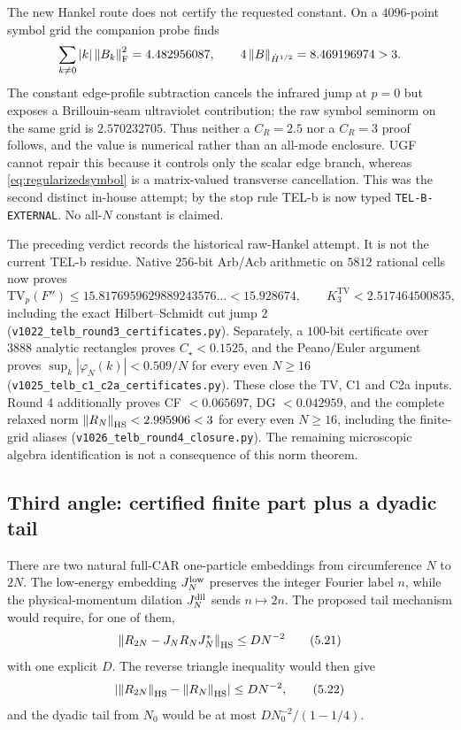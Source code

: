 \begin{remark}
The new Hankel route does not certify the requested constant.  On a
$4096$-point symbol grid the companion probe finds
\[
 \sum_{k\ne0}|k|\left\lVert B_k\right\rVert_{\mathrm F}^2
 =4.482956087,\qquad
 4\left\lVert B\right\rVert_{\dot H^{1/2}}=8.469196974>3.
\]
The constant edge-profile subtraction cancels the infrared jump at
$p=0$ but exposes a Brillouin-seam ultraviolet contribution; the raw
symbol seminorm on the same grid is $2.570232705$.  Thus neither a
$C_R=2.5$ nor a $C_R=3$ proof follows, and the value is numerical rather
than an all-mode enclosure.  UGF cannot repair this because it controls
only the scalar edge branch, whereas \eqref{eq:regularizedsymbol} is a
matrix-valued transverse cancellation.  This was the second distinct
in-house attempt; by the stop rule TEL-b is now typed
\texttt{TEL-B-EXTERNAL}.  No all-$N$ constant is claimed.
\end{remark}

\begin{remark}
The preceding verdict records the historical raw-Hankel attempt.  It is not the
current TEL-b residue.  Native $256$-bit Arb/Acb arithmetic on $5812$ rational
cells now proves
\[
 \mathrm{TV}_p(F'')\le15.8176959629889243576\ldots<15.928674,
 \qquad K_3^{\mathrm{TV}}<2.517464500835,
\]
including the exact Hilbert--Schmidt cut jump $2$
(\texttt{v1022\_telb\_round3\_certificates.py}).  Separately, a $100$-bit
certificate over $3888$ analytic rectangles proves
$C_\star<0.1525$, and the Peano/Euler argument proves
$\sup_k|\varphi_N(k)|<0.509/N$ for every even $N\ge16$
(\texttt{v1025\_telb\_c1\_c2a\_certificates.py}).  These close the TV, C1 and
C2a inputs. Round 4 additionally proves CF $<0.065697$, DG $<0.042959$,
and the complete relaxed norm $\left\lVert R_N\right\rVert_{\mathrm{HS}}<2.995906<3$ for every even
$N\ge16$, including the finite-grid aliases
(\texttt{v1026\_telb\_round4\_closure.py}). The remaining microscopic
algebra identification is not a consequence of this norm theorem.
\end{remark}

\subsection{Third angle: certified finite part plus a dyadic tail}

There are two natural full-CAR one-particle embeddings from circumference
$N$ to $2N$.  The low-energy embedding $J_N^{\rm low}$ preserves the
integer Fourier label $n$, while the physical-momentum dilation
$J_N^{\rm dil}$ sends $n\mapsto2n$.  The proposed tail mechanism would
require, for one of them,
\[
 \left\lVert R_{2N}-J_NR_NJ_N^*\right\rVert_{\mathrm{HS}}\le DN^{-2}
\tag{5.21}\label{eq:Rtailproposed}
\]
with one explicit $D$.  The reverse triangle inequality would then give
\[
 \left|\left\lVert R_{2N}\right\rVert_{\mathrm{HS}}-\left\lVert R_N\right\rVert_{\mathrm{HS}}\right|
 \le DN^{-2},
\tag{5.22}\label{eq:Rnormtail}
\]
and the dyadic tail from $N_0$ would be at most
$DN_0^{-2}/(1-1/4)$.

